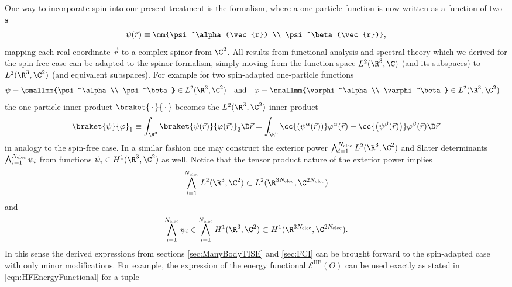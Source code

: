 \begin{rem}
	One way to incorporate spin into our present treatment
	is the  formalism,
	where a one-particle function is now written as a function of two
	\textbf{s}
	\begin{equation}
		\psi(\vec{r}) \equiv \mm{\psi^\alpha(\vec{r}) \\ \psi^\beta(\vec{r})},
		\label{eqn:OneParticleSpinor}
	\end{equation}
	mapping each real coordinate $\vec{r}$ to a complex spinor from $\C^2$.
	All results from functional analysis and spectral theory
	which we derived for the spin-free case can be adapted to the
	spinor formalism,
	simply moving from the function space $L^2(\R^3, \C)$
	(and its subspaces) to $L^2(\R^3, \C^2)$ (and equivalent subspaces).
	For example for two spin-adapted one-particle functions
	\begin{align*}
		\psi &\equiv \smallmm{\psi^\alpha\\ \psi^\beta} \in L^2(\R^3, \C^2)
		&&\text{and} &
		\varphi &\equiv \smallmm{\varphi^\alpha\\ \varphi^\beta} \in L^2(\R^3, \C^2)
	\end{align*}
	the one-particle inner product $\braket{\slot}{\slot}$ becomes
	the $L^2(\R^3, \C^2)$ inner product
	\[ \braket{\psi}{\varphi}_1 \equiv
		\int_{\R^3} \braket{\psi(\vec{r})}{\varphi(\vec{r})}_{2} \D \vec{r}
		= \int_{\R^3}
			\cc{\left(\psi^\alpha(\vec{r})\right)} \varphi^\alpha(\vec{r})
			+
			\cc{\left(\psi^\beta(\vec{r})\right)} \varphi^\beta(\vec{r})
		\D \vec{r}
	\]
	in analogy to the spin-free case.
	In a similar fashion one may construct the exterior power
	$\bigwedge_{i=1}^{\Nelec} L^2(\R^3, \C^2)$
	and Slater determinants $\bigwedge_{i=1}^{N_\text{elec}} \psi_i$
	from functions $\psi_i \in H^1(\R^3, \C^2)$ as well.
	Notice that the tensor product nature of the exterior power implies
	\[ \bigwedge_{i=1}^{\Nelec} L^2(\R^3, \C^2) \subset L^2(\R^{3\Nelec}, \C^{2\Nelec}) \]
	and
	\begin{equation}
		\bigwedge_{i=1}^{\Nelec} \psi_i \in \bigwedge_{i=1}^{\Nelec} H^1(\R^3, \C^2)
		\subset H^1(\R^{3\Nelec}, \C^{2\Nelec}).
		\label{eqn:SpinAnsatzSpace}
	\end{equation}
	In this sense the derived expressions
	from sections \ref{sec:ManyBodyTISE} and \ref{sec:FCI}
	can be brought forward to the spin-adapted case with only minor modifications.
	For example, the expression of the \HF energy functional
	$\mathcal{E}^\text{HF}(\Theta)$ can be used exactly as stated in
	\eqref{eqn:HFEnergyFunctional}
	for a tuple

\end{rem}
